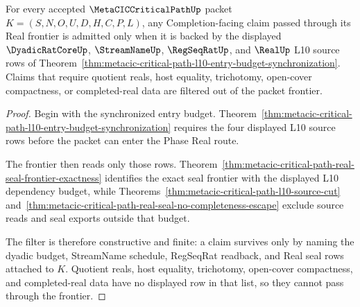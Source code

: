 \begin{theorem}
\label{thm:metacic-critical-path-real-completion-frontier-filter}
For every accepted $\MetaCICCriticalPathUp$ packet $K=(S,N,O,U,D,H,C,P,L)$, any Completion-facing claim passed through its Real frontier is admitted only when it is backed by the displayed $\DyadicRatCoreUp$, $\StreamNameUp$, $\RegSeqRatUp$, and $\RealUp$ L10 source rows of Theorem~\ref{thm:metacic-critical-path-l10-entry-budget-synchronization}. Claims that require quotient reals, host equality, trichotomy, open-cover compactness, or completed-real data are filtered out of the packet frontier.
\end{theorem}
\begin{proof}
Begin with the synchronized entry budget. Theorem~\ref{thm:metacic-critical-path-l10-entry-budget-synchronization} requires the four displayed L10 source rows before the packet can enter the Phase Real route.

The frontier then reads only those rows. Theorem~\ref{thm:metacic-critical-path-real-seal-frontier-exactness} identifies the exact seal frontier with the displayed L10 dependency budget, while Theorems~\ref{thm:metacic-critical-path-l10-source-cut} and~\ref{thm:metacic-critical-path-real-seal-no-completeness-escape} exclude source reads and seal exports outside that budget.

The filter is therefore constructive and finite: a claim survives only by naming the dyadic budget, StreamName schedule, RegSeqRat readback, and Real seal rows attached to $K$. Quotient reals, host equality, trichotomy, open-cover compactness, and completed-real data have no displayed row in that list, so they cannot pass through the frontier.
\end{proof}

